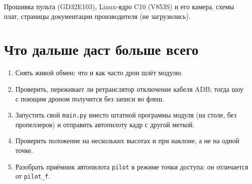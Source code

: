 Прошивка пульта (GD32E103), Linux-ядро C10 (V853S) и его камера, схемы плат, страницы документации производителя (не загрузились).

\section{Что дальше даст больше всего}

\begin{enumerate}
  \item Снять живой обмен: что и как часто дрон шлёт модулю.
  \item Проверить, переживает ли ретранслятор отключение кабеля ADB; тогда шоу с поющим дроном получится без записи во флеш.
  \item Запустить свой \texttt{main.py} вместо штатной программы модуля (на столе, без пропеллеров) и отправить автопилоту кадр с другой меткой.
  \item Проверить положение на нескольких высотах и при наклоне, а не на одной точке.
  \item Разобрать приёмник автопилота \texttt{pilot} в режиме точки доступа: он отличается от \texttt{pilot\_f}.
\end{enumerate}
